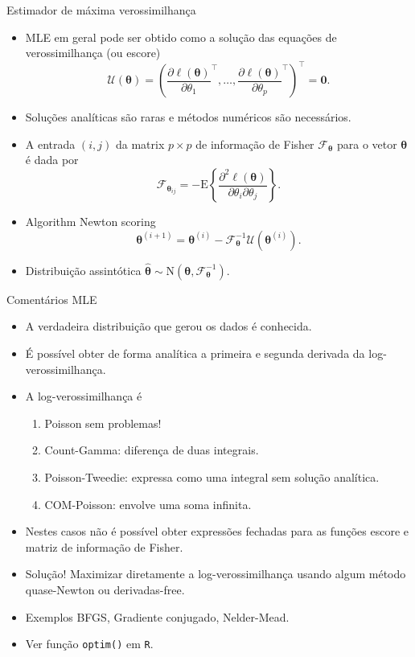 \documentclass[10pt, aspectratio=169]{beamer}\usepackage[]{graphicx}\usepackage[]{color}
\begin{document}
\begin{frame}{Estimador de máxima verossimilhança}
\begin{itemize}
  \item MLE em geral pode ser obtido como a solução das equações de verossimilhança (ou escore)
  $$\mathcal{U}(\boldsymbol{\theta}) = \left ( \frac{\partial \ell(\boldsymbol{\theta})}{\partial \theta_1}^\top, \ldots, \frac{\partial \ell(\boldsymbol{\theta})}{\partial \theta_p}^\top \right )^\top = \boldsymbol{0}.$$
  \item Soluções analíticas são raras e métodos numéricos são necessários.
  \item A entrada $(i,j)$ da matrix $p \times p$ de informação de Fisher 
  $\mathcal{F}_{\boldsymbol{\theta}}$ para o vetor $\boldsymbol{\theta}$ é dada por
$$
\mathcal{F}_{\boldsymbol{\theta}_{ij}} =-\mathrm{E} \left \{ \frac{\partial^2 \ell(\boldsymbol{\theta})}{\partial\theta_i\partial\theta_j} \right \}.
$$
  \item Algorithm Newton scoring
$$  
\boldsymbol{\theta}^{(i+1)} = \boldsymbol{\theta}^{(i)} - \mathcal{F}_{\boldsymbol{\theta}}^{-1} \mathcal{U}(\boldsymbol{\theta}^{(i)}).
$$
  \item Distribuição assintótica $\boldsymbol{\hat{\theta}} \sim \mathrm{N}(\boldsymbol{\theta}, \mathcal{F}_{\boldsymbol{\theta}}^{-1})$.
\end{itemize}
\end{frame}

\begin{frame}{Comentários MLE}
\begin{itemize}
  \item A verdadeira distribuição que gerou os dados é conhecida.
  \item É possível obter de forma analítica a primeira e segunda derivada
  da log-verossimilhança.
  \item A log-verossimilhança é
  \begin{enumerate}
    \item Poisson sem problemas!
    \item Count-Gamma: diferença de duas integrais.
    \item Poisson-Tweedie: expressa como uma integral sem solução analítica.
    \item COM-Poisson: envolve uma soma infinita.
  \end{enumerate}
  \item Nestes casos não é possível obter expressões fechadas para as
  funções escore e matriz de informação de Fisher.
  \item Solução! Maximizar diretamente a log-verossimilhança usando
  algum método quase-Newton ou derivadas-free. 
  \item Exemplos BFGS, Gradiente conjugado, Nelder-Mead.
  \item Ver função \texttt{optim()} em \texttt{R}.
  
\end{itemize}
\end{frame}
\end{document}
